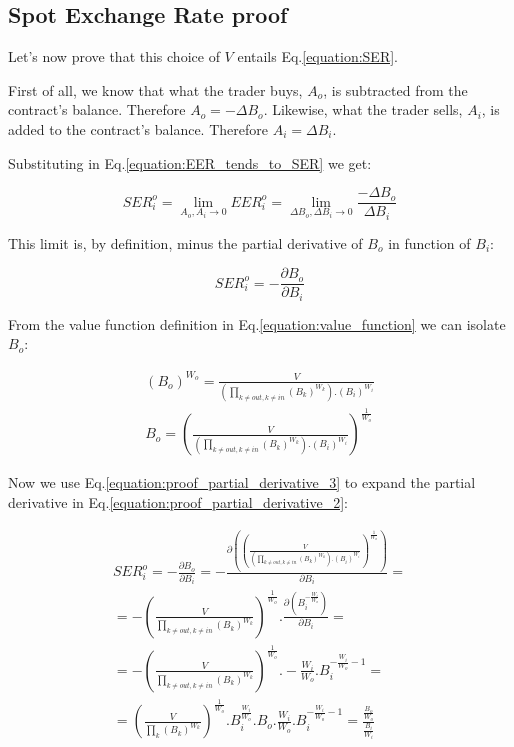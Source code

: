 \documentclass[11pt]{amsart}
\begin{document}
\subsection{Spot Exchange Rate proof}
Let's now prove that this choice of $V$ entails Eq.\ref{equation:SER}.

First of all, we know that what the trader buys, $A_{o}$, is subtracted from the contract's balance. Therefore $A_{o}=-\Delta B_{o}$. Likewise, what the trader sells, $A_{i}$, is added to the contract's balance. Therefore $A_{i} = \Delta B_{i}$.

Substituting in Eq.\ref{equation:EER_tends_to_SER} we get:

\begin{equation}
\label{equation:proof_partial_derivative_1}
SER^{o}_{i} = \lim_{A_{o},A_{i}\to 0} EER^{o}_{i} = \lim_{\Delta B_{o},\Delta B_{i}\to 0} \frac{-\Delta B_{o}}{\Delta B_{i}}
\end{equation}

This limit is, by definition, minus the partial derivative of $B_{o}$ in function of $B_{i}$:

\begin{equation}
\label{equation:proof_partial_derivative_2}
SER^{o}_{i} = -\frac{\partial B_{o}}{\partial B_{i}}
\end{equation}

From the value function definition in Eq.\ref{equation:value_function} we can isolate $B_{o}$:

\begin{equation}
\label{equation:proof_partial_derivative_3}
\begin{gathered}
(B_{o})^{W_{o}} =  \frac{V}{\left(\prod_{k\neq out, k\neq in}(B_k)^{W_k}\right).(B_{i})^{W_{i}}}\\
B_{o} =  \left(\frac{V}{\left(\prod_{k\neq out, k\neq in}(B_k)^{W_k}\right).(B_{i})^{W_{i}}}\right)^\frac{1}{W_{o}}
\end{gathered}
\end{equation}

Now we use Eq.\ref{equation:proof_partial_derivative_3} to expand the partial derivative in Eq.\ref{equation:proof_partial_derivative_2}:

\begin{equation}
\begin{gathered}
SER^{o}_{i} =
-\frac{\partial B_{o}}{\partial B_{i}} =
-\frac{\partial{\left(\left(\frac{V}{\left(\prod_{k\neq out, k\neq in}(B_k)^{W_k}\right).(B_{i})^{W_{i}}}\right)^\frac{1}{W_{o}}\right)}}{\partial B_{i}}  =\\
=-\left(\frac{V}{\prod_{k\neq out, k\neq in}(B_k)^{W_k}}\right)^\frac{1}{W_{o}}
.
\frac{\partial{\left(B_{i}^{-\frac{W_{i}}{W_{o}}}\right)}}{\partial B_{i}} =\\
=-\left(\frac{V}{\prod_{k\neq out, k\neq in}(B_k)^{W_k}}\right)^\frac{1}{W_{o}}
.
-\frac{W_{i}}{W_{o}}.B_{i}^{-\frac{W_{i}}{W_{o}}-1} =\\
=\left(\frac{V}{\prod_{k}(B_k)^{W_k}}\right)^\frac{1}{W_{o}}
.B_{i}^{\frac{W_{i}}{W_{o}}}.B_{o}
.\frac{W_{i}}{W_{o}}.B_{i}^{-\frac{W_{i}}{W_{o}}-1} = \frac{\frac{B_{o}}{W_{o}}}{\frac{B_{i}}{W_{i}}}
\end{gathered}
\end{equation}
\end{document}
